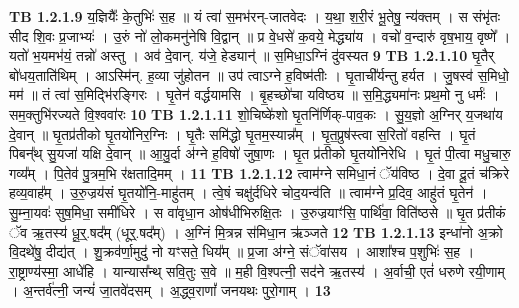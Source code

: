 \documentclass[17pt]{extarticle}
\begin{document}
                  \newline
                                \textbf{ TB 1.2.1.9} \newline
                  य॒ज्ञियैः᳚ के॒तुभिः॑ स॒ह ॥ यं त्वा॑ स॒मभ॑रन्-जातवेदः । य॒था॒ श॒री॒रं भू॒तेषु॒ न्य॑क्तम् । स संभृ॑तः सीद शि॒वः प्र॒जाभ्यः॑ । उ॒रुं नो॑ लो॒कमनु॑नेषि वि॒द्वान् ॥ प्र वे॒धसे॑ क॒वये॒ मेद्ध्या॑य । वचो॑ व॒न्दारु॑ वृष॒भाय॒ वृष्णे᳚ । यतो॑ भ॒यमभ॑यं॒ तन्नो॑ अस्तु । अव॑ दे॒वान्. य॑जे॒ हेड्यान्॑ ॥ स॒मिधा॒ऽग्निं दु॑वस्यत \textbf{ 9} \newline
                  \newline
                                \textbf{ TB 1.2.1.10} \newline
                  घृ॒तैर् बो॑धय॒ताति॑थिम् । आऽस्मि॑न्. ह॒व्या जु॑होतन ॥ उप॑ त्वाऽग्ने ह॒विष्म॑तीः । घृ॒ताची᳚र्यन्तु हर्यत । जु॒षस्व॑ स॒मिधो॒ मम॑ ॥ तं त्वा॑ स॒मिद्भि॑रङ्गिरः । घृ॒तेन॑ वर्द्धयामसि । बृ॒हच्छो॑चा यविष्ठ्य ॥ स॒मि॒द्ध्यमा॑नः प्रथ॒मो नु धर्मः॑ । सम॒क्तुभि॑रज्यते वि॒श्ववा॑रः \textbf{ 10} \newline
                  \newline
                                \textbf{ TB 1.2.1.11} \newline
                  शो॒चिष्के॑शो घृ॒तनि॑र्णिक्-पाव॒कः । सु॒य॒ज्ञो अ॒ग्निर् य॒जथा॑य दे॒वान् ॥ घृ॒तप्र॑तीको घृ॒तयो॑निर॒ग्निः । घृ॒तैः समि॑द्धो घृ॒तम॒स्यान्न᳚म् । घृ॒त॒प्रुष॑स्त्वा स॒रितो॑ वहन्ति । घृ॒तं पिबन्᳚थ् सु॒यजा॑ यक्षि दे॒वान् ॥ आ॒यु॒र्दा अ॑ग्ने ह॒विषो॑ जुषा॒णः । घृ॒त प्र॑तीको घृ॒तयो॑निरेधि । घृ॒तं पी॒त्वा मधु॒चारु॒ गव्य᳚म् । पि॒तेव॑ पु॒त्रम॒भि र॑क्षतादि॒मम् । \textbf{ 11} \newline
                  \newline
                                \textbf{ TB 1.2.1.12} \newline
                  त्वाम॑ग्ने समिधा॒नं ॅय॑विष्ठ । दे॒वा दू॒तं च॑क्रिरे हव्य॒वाह᳚म् । उ॒रु॒ज्रय॑सं घृ॒तयो॑नि॒-माहु॑तम् । त्वे॒षं चक्षु॑र्दधिरे चोद॒यन्व॑ति ॥ त्वाम॑ग्ने प्र॒दिव॒ आहु॑तं घृ॒तेन॑ । सु॒म्ना॒यवः॑ सुष॒मिधा॒ समी॑धिरे । स वा॑वृधा॒न ओष॑धीभिरुक्षि॒तः । उ॒रुज्रयाꣳ॑सि॒ पार्थि॑वा॒ विति॑ष्ठसे ॥ घृ॒त प्र॑तीकं ॅव ऋ॒तस्य॑ धू॒र्॒.षद᳚म् (धूर्॒.षद᳚म्) । अ॒ग्निं मि॒त्रन्न स॑मिधा॒न ऋ॑ञ्जते \textbf{ 12} \newline
                  \newline
                                \textbf{ TB 1.2.1.13} \newline
                  इन्धा॑नो अ॒क्रो वि॒दथे॑षु॒ दीद्य॑त् । शु॒क्रव॑र्णा॒मुदु॑ नो यꣳसते॒ धिय᳚म् ॥ प्र॒जा अ॑ग्ने॒ संॅवा॑सय । आशा᳚श्च प॒शुभिः॑ स॒ह । रा॒ष्ट्राण्य॑स्मा॒ आधे॑हि । यान्यास᳚न्थ् सवि॒तुः स॒वे ॥ म॒ही वि॒श्पत्नी॒ सद॑ने ऋ॒तस्य॑ । अ॒र्वाची॒ एतं॑ धरुणे रयी॒णाम् । अ॒न्तर्व॑त्नी॒ जन्यं॑ जा॒तवे॑दसम् । अ॒द्ध्व॒राणां᳚ जनयथः पुरो॒गाम् । \textbf{ 13} \newline
\end{document}
